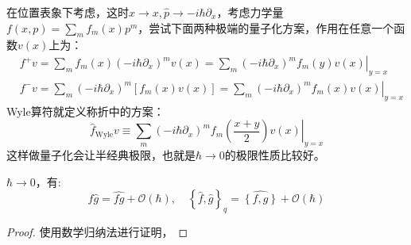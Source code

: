 在位置表象下考虑，这时$\hat x\to x,\hat p\to-i\hbar\partial_x$，考虑力学量$f(x,p)=\sum_m f_m(x)p^m$，尝试下面两种极端的量子化方案，作用在任意一个函数$v(x)$上为：
\begin{equation}
	\begin{aligned}
		&f^+v =\sum_m f_m(x)\left(-i\hbar\partial_x\right)^m v(x)=\sum_m \left.\left(-i\hbar\partial_x\right)^m f_m(y)v(x)\right|_{y=x}\\
		&f^-v =\sum_m \left(-i\hbar\partial_x\right)^m \left[f_m(x)v(x)\right]=\sum_m \left.\left(-i\hbar\partial_x\right)^m f_m(x)v(x)\right|_{y=x}
	\end{aligned}
\end{equation}
Wyle算符就定义称折中的方案：
\begin{equation}
	\hat f_{\text{Wyle}} v \equiv \sum_m \left.\left(-i\hbar\partial_x\right)^m f_m\left(\frac{x+y}{2}\right)v(x)\right|_{y=x}
\end{equation}
这样做量子化会让半经典极限，也就是$\hbar\to 0$的极限性质比较好。

\begin{theorem}[半经典极限]
	$\hbar \to 0$，有:
	\begin{equation}
		\hat f \hat g=\widehat{fg}+\mathcal{O}(\hbar),\quad\left\{\hat f,\hat g\right\}_q=\widehat{\left\{f,g\right\}}+\mathcal{O}(\hbar)
	\end{equation}
\end{theorem}
\begin{proof}
 	使用数学归纳法进行证明，
\end{proof}

